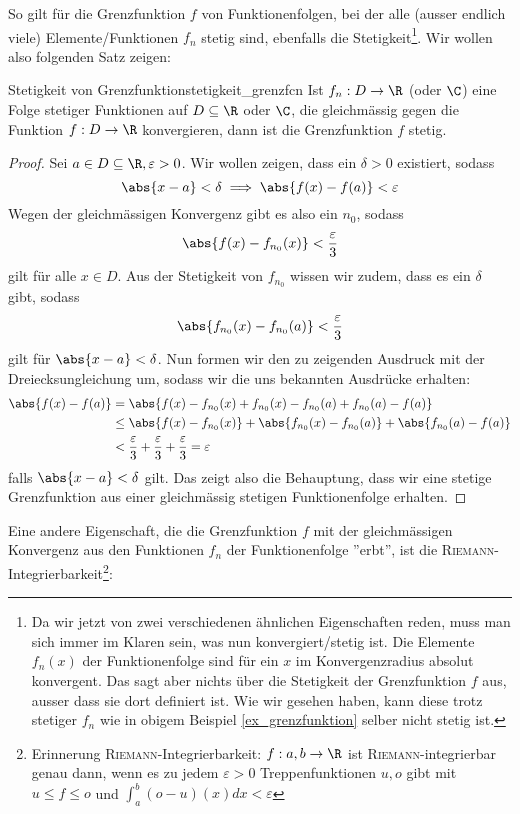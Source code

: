 So gilt für die Grenzfunktion $f$ von Funktionenfolgen, bei der alle (ausser endlich viele) Elemente/Funktionen $f_n$ stetig sind, ebenfalls die Stetigkeit\footnote{Da wir jetzt von zwei verschiedenen ähnlichen Eigenschaften reden, muss man sich immer im Klaren sein, was nun konvergiert/stetig ist. Die Elemente $f_n(x)$ der Funktionenfolge sind für ein $x$ im Konvergenzradius absolut konvergent. Das sagt aber nichts über die Stetigkeit der Grenzfunktion $f$ aus, ausser dass sie dort definiert ist. Wie wir gesehen haben, kann diese trotz stetiger $f_n$ wie in obigem Beispiel \ref{ex_grenzfunktion} selber nicht stetig ist.}. Wir wollen also folgenden Satz zeigen:

\begin{satz}{Stetigkeit von Grenzfunktion}{stetigkeit_grenzfcn}
Ist $f_n: D \to \R$ (oder $\C$) eine Folge stetiger Funktionen auf $D \subseteq \R$ oder $\C$, die gleichmässig gegen die Funktion $f: D\to \R$ konvergieren, dann ist die Grenzfunktion $f$ stetig.
\end{satz}

\begin{proof} Sei $a \in D \subseteq \R, \varepsilon > 0$. Wir wollen zeigen, dass ein $\delta > 0$ existiert, sodass
$$\abs{x-a} < \delta \implies \abs{f(x) - f(a)} < \varepsilon$$
Wegen der gleichmässigen Konvergenz gibt es also ein $n_0$, sodass
$$\abs{f(x)-f_{n_0}(x)}<\frac{\varepsilon}{3}$$
gilt für alle $x\in D$. Aus der Stetigkeit von $f_{n_0}$ wissen wir zudem, dass es ein $\delta$ gibt, sodass 
$$\abs{f_{n_0}(x)-f_{n_0}(a)} < \frac{\varepsilon}{3}$$
gilt für $\abs{x-a} < \delta$. Nun formen wir den zu zeigenden Ausdruck mit der Dreiecksungleichung um, sodass wir die uns bekannten Ausdrücke erhalten:
\begin{align*}
    \abs{f(x) - f(a)} &= \abs{f(x) - f_{n_0}(x) + f_{n_0}(x) - f_{n_0}(a)+f_{n_0}(a) - f(a)}\\
    &\leq \abs{f(x) - f_{n_0}(x)} + \abs{f_{n_0}(x) - f_{n_0}(a)} + \abs{f_{n_0}(a) - f(a)}\\
    &< \frac{\varepsilon}{3} +  \frac{\varepsilon}{3} + \frac{\varepsilon}{3} = \varepsilon
\end{align*}
falls $\abs{x - a} < \delta$ gilt. Das zeigt also die Behauptung, dass wir eine stetige Grenzfunktion aus einer gleichmässig stetigen Funktionenfolge erhalten.
\end{proof}

Eine andere Eigenschaft, die die Grenzfunktion $f$ mit der gleichmässigen Konvergenz aus den Funktionen $f_n$ der Funktionenfolge ''erbt'', ist die \textsc{Riemann}-Integrierbarkeit\footnote{Erinnerung \textsc{Riemann}-Integrierbarkeit: $f:{a,b} \to \R$ ist \textsc{Riemann}-integrierbar genau dann, wenn es zu jedem $\varepsilon > 0$ Treppenfunktionen $u,o$ gibt mit $u \leq f \leq o$ und $\int_a^b(o-u)(x)dx < \varepsilon$}:

